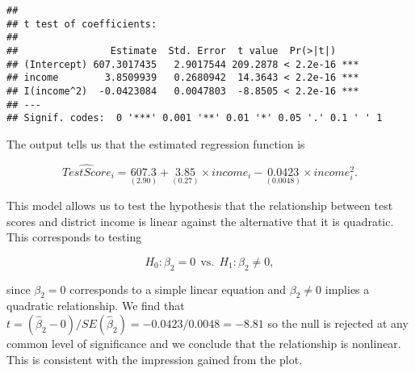 \documentclass[
]{article}
\newenvironment{Shaded}{\begin{snugshade}}{\end{snugshade}}
\newcommand{\AttributeTok}[1]{\textcolor[rgb]{0.77,0.63,0.00}{#1}}
\newcommand{\CommentTok}[1]{\textcolor[rgb]{0.56,0.35,0.01}{\textit{#1}}}
\newcommand{\DecValTok}[1]{\textcolor[rgb]{0.00,0.00,0.81}{#1}}
\newcommand{\FunctionTok}[1]{\textcolor[rgb]{0.00,0.00,0.00}{#1}}
\newcommand{\NormalTok}[1]{#1}
\newcommand{\OtherTok}[1]{\textcolor[rgb]{0.56,0.35,0.01}{#1}}
\newcommand{\SpecialCharTok}[1]{\textcolor[rgb]{0.00,0.00,0.00}{#1}}
\newcommand{\StringTok}[1]{\textcolor[rgb]{0.31,0.60,0.02}{#1}}
\begin{document}
\begin{verbatim}
## 
## t test of coefficients:
## 
##                Estimate  Std. Error  t value  Pr(>|t|)    
## (Intercept) 607.3017435   2.9017544 209.2878 < 2.2e-16 ***
## income        3.8509939   0.2680942  14.3643 < 2.2e-16 ***
## I(income^2)  -0.0423084   0.0047803  -8.8505 < 2.2e-16 ***
## ---
## Signif. codes:  0 '***' 0.001 '**' 0.01 '*' 0.05 '.' 0.1 ' ' 1
\end{verbatim}

The output tells us that the estimated regression function is

\[\widehat{TestScore}_i = \underset{(2.90)}{607.3} + \underset{(0.27)}{3.85} \times income_i - \underset{(0.0048)}{0.0423} \times income_i^2.\]

This model allows us to test the hypothesis that the relationship
between test scores and district income is linear against the
alternative that it is quadratic. This corresponds to testing

\[H_0: \beta_2 = 0 \ \ \text{vs.} \ \  H_1: \beta_2\neq0,\]

since \(\beta_2=0\) corresponds to a simple linear equation and
\(\beta_2\neq0\) implies a quadratic relationship. We find that
\(t=(\hat\beta_2 - 0)/SE(\hat\beta_2) = -0.0423/0.0048 = -8.81\) so the
null is rejected at any common level of significance and we conclude
that the relationship is nonlinear. This is consistent with the
impression gained from the plot.

\begin{Shaded}
\end{Shaded}
\end{document}
